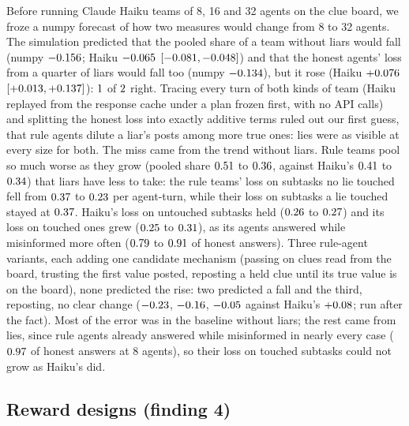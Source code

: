 \documentclass{article}
\begin{document}
Before running Claude Haiku teams of 8, 16 and 32 agents on the clue board, we froze a numpy forecast of how two measures would change from 8 to 32 agents. The simulation predicted that the pooled share of a team without liars would fall (numpy $-0.156$; Haiku $-0.065$ $[-0.081, -0.048]$) and that the honest agents' loss from a quarter of liars would fall too (numpy $-0.134$), but it rose (Haiku $+0.076$ $[+0.013, +0.137]$): $1$ of $2$ right. Tracing every turn of both kinds of team (Haiku replayed from the response cache under a plan frozen first, with no API calls) and splitting the honest loss into exactly additive terms ruled out our first guess, that rule agents dilute a liar's posts among more true ones: lies were as visible at every size for both. The miss came from the trend without liars. Rule teams pool so much worse as they grow (pooled share $0.51$ to $0.36$, against Haiku's $0.41$ to $0.34$) that liars have less to take: the rule teams' loss on subtasks no lie touched fell from $0.37$ to $0.23$ per agent-turn, while their loss on subtasks a lie touched stayed at $0.37$. Haiku's loss on untouched subtasks held ($0.26$ to $0.27$) and its loss on touched ones grew ($0.25$ to $0.31$), as its agents answered while misinformed more often ($0.79$ to $0.91$ of honest answers). Three rule-agent variants, each adding one candidate mechanism (passing on clues read from the board, trusting the first value posted, reposting a held clue until its true value is on the board), none predicted the rise: two predicted a fall and the third, reposting, no clear change ($-0.23$, $-0.16$, $-0.05$ against Haiku's $+0.08$; run after the fact). Most of the error was in the baseline without liars; the rest came from lies, since rule agents already answered while misinformed in nearly every case ($0.97$ of honest answers at 8 agents), so their loss on touched subtasks could not grow as Haiku's did.

\subsection{Reward designs (finding 4)}
\end{document}
